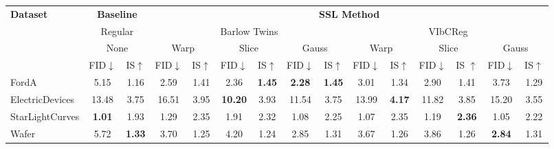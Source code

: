 \documentclass[../../thesis.tex]{subfiles}
\begin{document}
\begin{table}[H]
    \centering
    \begin{adjustbox}{width=\textwidth}
     \begin{tabular}{lcc|cc|cc|cc|cc|cc|cc} %
        \toprule
        \multirow{4}{*}{\textbf{Dataset}} & \multicolumn{2}{c}{\textbf{Baseline}} & \multicolumn{12}{c}{\textbf{SSL Method}} \\
                                            \cmidrule(lr){2-3} \cmidrule(lr){4-15}
                                          & \multicolumn{2}{c}{Regular}           & \multicolumn{6}{c}{Barlow Twins}                                                 &  \multicolumn{6}{c}{VIbCReg} \\
                                          \cmidrule(lr){2-3} \cmidrule(lr){4-9} \cmidrule(lr){10-15}
                                          &   \multicolumn{2}{c}{None}            & \multicolumn{2}{c}{Warp}  & \multicolumn{2}{c}{Slice} & \multicolumn{2}{c}{Gauss} & \multicolumn{2}{c}{Warp} & \multicolumn{2}{c}{Slice} & \multicolumn{2}{c}{Gauss} \\
                                          \cmidrule(lr){2-3} \cmidrule(lr){4-5} \cmidrule(lr){6-7} \cmidrule(lr){8-9} \cmidrule(lr){10-11} \cmidrule(lr){12-13}\cmidrule(lr){14-15}
                                          & FID$\downarrow$ & IS$\uparrow $                             & FID$\downarrow$ & IS$\uparrow$                  & FID$\downarrow$ & IS$\uparrow$                & FID$\downarrow$ & IS$\uparrow$                 & FID$\downarrow$ & IS$\uparrow$                 & FID$\downarrow$ & IS $\uparrow$                 & FID$\downarrow$ & IS$\uparrow$   \\
        \midrule
        FordA                   & 5.15 & 1.16 & 2.59 & 1.41 & 2.36 &\textbf{ 1.45} & \textbf{2.28} & \textbf{1.45} & 3.01 & 1.34 & 2.90 & 1.41 & 3.73 & 1.29 \\
        ElectricDevices         & 13.48 & 3.75 & 16.51 & 3.95 & \textbf{10.20} & 3.93 & 11.54 & 3.75 & 13.99 & \textbf{4.17} & 11.82 & 3.85 & 15.20 & 3.55 \\
        StarLightCurves         & \textbf{1.01} & 1.93 & 1.29 & 2.35 & 1.91 & 2.32 & 1.08 & 2.25 & 1.07 & 2.35 & 1.19 & \textbf{2.36} & 1.05 & 2.22 \\
        Wafer                   & 5.72 & \textbf{1.33} & 3.70 & 1.25 & 4.20 & 1.24 & 2.85 & 1.31 & 3.67 & 1.26 & 3.86 & 1.26 & \textbf{2.84} & 1.31 \\

\end{tabular}
\end{adjustbox}
\end{table}
\end{document}
